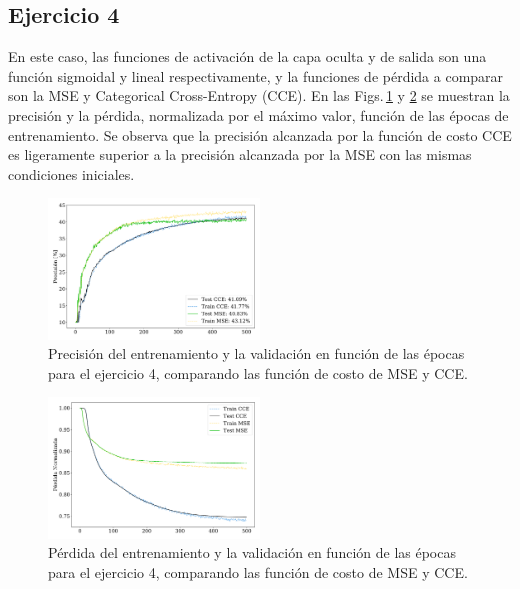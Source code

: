 \subsection*{Ejercicio 4}

En este caso, las funciones de activación de la capa oculta y de salida son una función sigmoidal y lineal respectivamente, y la funciones de pérdida a comparar son la MSE y Categorical Cross-Entropy (CCE). En las Figs.\,\ref{fig:ejer4_acc} y \ref{fig:ejer4_loss} se muestran la precisión y la pérdida, normalizada por el máximo valor, función de las épocas de entrenamiento.  Se observa que la precisión alcanzada por la función de costo CCE es ligeramente superior a la precisión alcanzada por la MSE con las mismas condiciones iniciales.

\begin{figure}[H]
    \begin{small}
        \begin{center}
            \includegraphics[width=0.5\textwidth]{Graphs/ejer4_acc.pdf}
        \end{center}
        \caption{Precisión del entrenamiento y la validación en función de las épocas para el  ejercicio 4, comparando las función de costo de MSE y CCE.}
        \label{fig:ejer4_acc}
    \end{small}
\end{figure}

\begin{figure}[H]
    \begin{small}
        \begin{center}
            \includegraphics[width=0.5\textwidth]{Graphs/ejer4_loss.pdf}
        \end{center}
        \caption{Pérdida del entrenamiento y la  validación en función de las épocas para el  ejercicio 4, comparando las función de costo de MSE y CCE.}
        \label{fig:ejer4_loss}
    \end{small}
\end{figure}


